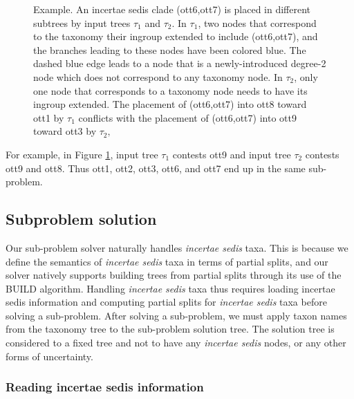 \documentclass[english]{article}
\newcommand{\lyxdot}{.}
\begin{document}
\begin{figure}

\caption{\label{fig:placement-example1}Example. An incertae sedis clade (ott6,ott7)
is placed in different subtrees by input trees $\tau_{1}$ and $\tau_{2}$.
In $\tau_{1}$, two nodes that correspond to the taxonomy their ingroup
extended to include (ott6,ott7), and the branches leading to these
nodes have been colored blue. The dashed blue edge leads to a node
that is a newly-introduced degree-2 node which does not correspond
to any taxonomy node. In $\tau_{2}$, only one node that corresponds
to a taxonomy node needs to have its ingroup extended. The placement
of (ott6,ott7) into ott8 toward ott1 by $\tau_{1}$ conflicts with
the placement of (ott6,ott7) into ott9 toward ott3 by $\tau_{2},$}
\end{figure}
 For example, in Figure
\ref{fig:placement-example1}, input tree $\tau_{1}$ contests ott9 and
input tree $\tau_{2}$ contests ott9 and ott8. Thus ott1, ott2, ott3,
ott6, and ott7 end up in the same sub-problem.

\subsection{Subproblem solution}

Our sub-problem solver naturally handles \emph{incertae sedis} taxa.
This is because we define the semantics of \emph{incertae sedis} taxa
in terms of partial splits, and our solver natively supports building
trees from partial splits through its use of the BUILD algorithm.
Handling \emph{incertae sedis} taxa thus requires loading incertae
sedis information and computing partial splits for \emph{incertae
sedis} taxa before solving a sub-problem. After solving a sub-problem,
we must apply taxon names from the taxonomy tree to the sub-problem
solution tree. The solution tree is considered to a fixed tree and not
to have any \emph{incertae sedis} nodes, or any other forms of
uncertainty.

\subsubsection{Reading incertae sedis information}
\end{document}
